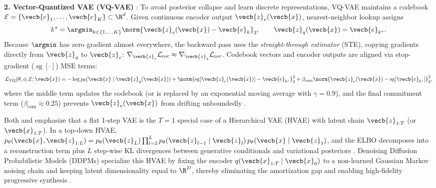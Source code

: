\documentclass[../../../../master.tex]{subfiles}
\begin{document}
\begin{coremath}
\textbf{2. Vector-Quantized VAE (VQ-VAE)} : To avoid posterior collapse and learn discrete representations, VQ-VAE maintains a codebook $\mathcal{E} = \{\vecb{e}_1, \dots, \vecb{e}_K\} \subset \R^d$. Given continuous encoder output $\vecb{z}_e(\vecb{x})$, nearest-neighbor lookup assigns
\begin{equation}\label{eq:vae:vq_lookup}
  k^* = \argmin_{k \in \{1,\dots,K\}} \norm{\vecb{z}_e(\vecb{x}) - \vecb{e}_k}_2, \qquad \vecb{z}_q(\vecb{x}) = \vecb{e}_{k^*}.
\end{equation}
Because $\argmin$ has zero gradient almost everywhere, the backward pass uses the \emph{straight-through estimator} (STE), copying gradients directly from $\vecb{z}_q$ to $\vecb{z}_e$: $\nabla_{\vecb{z}_e} \mathcal{L}_{\mathrm{rec}} \approx \nabla_{\vecb{z}_q} \mathcal{L}_{\mathrm{rec}}$. Codebook vectors and encoder outputs are aligned via stop-gradient ($\operatorname{sg}[\cdot]$) MSE terms:
\begin{equation}\label{eq:vae:vq_loss}
  \mathcal{L}_{\mathrm{VQ}}(\theta, \phi, \mathcal{E}; \vecb{x})
  = -\log p_\theta(\vecb{x} \mid \vecb{z}_q(\vecb{x}))
  + \norm{\operatorname{sg}[\vecb{z}_e(\vecb{x})] - \vecb{e}_{k^*}}_2^2
  + \beta_{\mathrm{com}} \norm{\vecb{z}_e(\vecb{x}) - \operatorname{sg}[\vecb{e}_{k^*}]}_2^2,
\end{equation}
where the middle term updates the codebook (or is replaced by an exponential moving average with $\gamma=0.9$), and the final commitment term ($\beta_{\mathrm{com}} \approx 0.25$) prevents $\vecb{z}_e(\vecb{x})$ from drifting unboundedly .
\end{coremath}

\begin{crossbook}
Both  and  emphasize that a flat 1-step VAE is the $T=1$ special case of a Hierarchical VAE (HVAE) with latent chain $\vecb{z}_{1:T}$ (or $\vecb{x}_{1:T}$). In a top-down HVAE, $p_\theta(\vecb{x}, \vecb{z}_{1:L}) = p_\theta(\vecb{z}_L)\prod_{l=2}^L p_\theta(\vecb{z}_{l-1}\mid \vecb{z}_l)\,p_\theta(\vecb{x}\mid \vecb{z}_1)$, and the ELBO decomposes into a reconstruction term plus $L$ step-wise KL divergences between generative conditionals and variational posteriors  . Denoising Diffusion Probabilistic Models (DDPMs) specialize this HVAE by fixing the encoder $q(\vecb{x}_{1:T}\mid \vecb{x}_0)$ to a non-learned Gaussian Markov noising chain and keeping latent dimensionality equal to $\R^D$, thereby eliminating the amortization gap and enabling high-fidelity progressive synthesis .
\end{crossbook}
\end{document}
